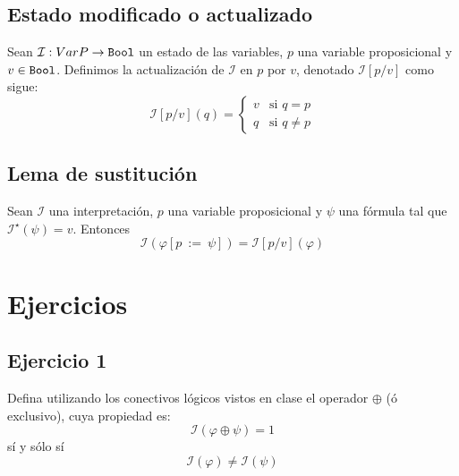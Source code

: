 \documentclass[a4paper]{article}
\begin{document}
\subsection{Estado modificado o actualizado}
\noindent
Sean $\mathcal{I}: VarP \to \text{\texttt{Bool}}$ un estado de las variables, $p$ una variable 
proposicional y $v \in \text{\texttt{Bool}}$. Definimos la actualización de $\mathcal{I}$ en $p$ por 
$v$, denotado $\mathcal{I}[p/v]$ como sigue:
\[
    \mathcal{I}\left[p / v\right]\left(q\right) =
    \begin{cases}
        v & \text{si } q = p \\
        q & \text{si } q \neq p
    \end{cases}
\]
\subsection{Lema de sustitución}
Sean $\mathcal{I}$ una interpretación, $p$ una variable 
proposicional y $\psi$ una fórmula tal que $\mathcal{I}^{\star}(\psi) = v$. Entonces
\[
    \mathcal{I}\left(\varphi\left[p \ := \ \psi\right]\right) = \mathcal{I}\left[p / v\right]\left(\varphi\right)
\]
\section{Ejercicios}
\subsection{Ejercicio 1}
Defina utilizando los conectivos lógicos vistos en clase el operador
$\oplus$ (ó exclusivo), cuya propiedad es:
\[
    \mathcal{I}\left(\varphi \oplus \psi\right) = 1
\]
sí y sólo sí
\[
    \mathcal{I}\left(\varphi\right) \neq \mathcal{I}\left(\psi\right)
\]
\end{document}
